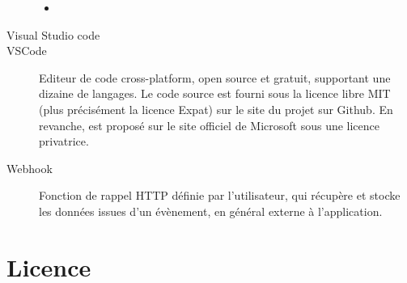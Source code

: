 \documentclass[letterpaper,10pt,french]{sphinxmanual}
\begin{document}
\begin{description}

\begin{itemize}
\item {} 

\end{itemize}



\item[{Visual Studio code\index{Visual Studio code|textbf}\phantomsection\label{\detokenize{readthedocs/glossary:term-visual-studio-code}}}] \leavevmode\item[{VSCode\index{VSCode|textbf}\phantomsection\label{\detokenize{readthedocs/glossary:term-vscode}}}] \leavevmode
Editeur de code cross-platform, open source et gratuit, supportant une dizaine de langages. Le code source est fourni sous la licence libre MIT (plus précisément la licence Expat) sur le site du projet sur Github. En revanche,  est proposé sur le site officiel de Microsoft sous une licence privatrice.

\item[{Webhook\index{Webhook|textbf}\phantomsection\label{\detokenize{readthedocs/glossary:term-webhook}}}] \leavevmode
{}

Fonction de rappel HTTP définie par l’utilisateur, qui récupère et stocke les données issues d’un évènement, en général externe à l’application.

\end{description}


\chapter{Licence}
\label{\detokenize{licence:licence}}\label{\detokenize{licence:id1}}\label{\detokenize{licence::doc}}




\renewcommand{\indexname}{Index}
\printindex
\end{document}
